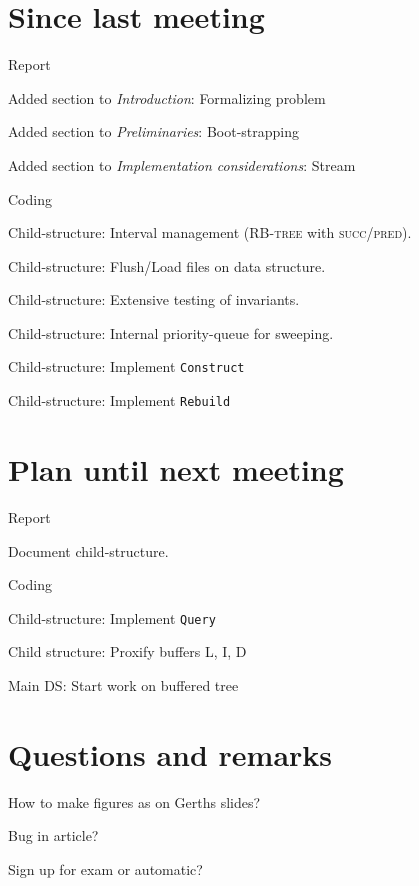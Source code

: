 \documentclass[a4paper,11pt,agenda,chair]{meetingmins}
\begin{document}
\maketitle

\section{Since last meeting}
\begin{items}
\item Report
	\begin{items}
		\item Added section to \textit{Introduction}: Formalizing problem
		\item Added section to \textit{Preliminaries}: Boot-strapping
		\item Added section to \textit{Implementation considerations}: Stream
	\end{items}
\item Coding
	\begin{items}
		\item Child-structure: Interval management (\textsc{RB-tree} with \textsc{succ}/\textsc{pred}).
		\item Child-structure: Flush/Load files on data structure.
		\item Child-structure: Extensive testing of invariants.
		\item Child-structure: Internal priority-queue for sweeping.
                \item Child-structure: Implement \texttt{Construct}
		\item Child-structure: Implement \texttt{Rebuild}
	\end{items}
\end{items}

\section{Plan until next meeting}
\begin{items}
\item Report
	\begin{items}
		\item Document child-structure.
	\end{items}
\item Coding
	\begin{items}
		\item Child-structure: Implement \texttt{Query}
                \item Child structure: Proxify buffers L, I, D
		\item Main DS: Start work on buffered tree
	\end{items}
\end{items}

\section{Questions and remarks}
\begin{items}
	\item How to make figures as on Gerths slides?
	\item Bug in article?
	\item Sign up for exam or automatic?
\end{items}
\end{document}

